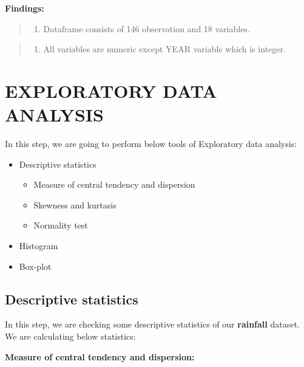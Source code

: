 \documentclass[12pt,openany]{book}
\providecommand{\tightlist}{%
  \setlength{\itemsep}{0pt}\setlength{\parskip}{0pt}}
\begin{document}
\textbf{Findings:}

\begin{quote}
\begin{enumerate}
\def\labelenumi{\arabic{enumi}.}
\tightlist
\item
  Dataframe consists of 146 observation and 18 variables.
\end{enumerate}
\end{quote}

\begin{quote}
\begin{enumerate}
\def\labelenumi{\arabic{enumi}.}
\setcounter{enumi}{1}
\tightlist
\item
  All variables are numeric except YEAR variable which is integer.
\end{enumerate}
\end{quote}

\hypertarget{exploratory-data-analysis}{%
\chapter{EXPLORATORY DATA ANALYSIS}\label{exploratory-data-analysis}}

In this step, we are going to perform below tools of Exploratory data analysis:

\begin{itemize}
\tightlist
\item
  Descriptive statistics

  \begin{itemize}
  \tightlist
  \item
    Measure of central tendency and dispersion
  \item
    Skewness and kurtasis
  \item
    Normality test
  \end{itemize}
\item
  Histogram
\item
  Box-plot
\end{itemize}

\hypertarget{descriptive-statistics}{%
\section{Descriptive statistics}\label{descriptive-statistics}}

In this step, we are checking some descriptive statistics of our \textbf{rainfall} dataset. We are calculating below statistics:

\textbf{Measure of central tendency and dispersion:}
\end{document}
